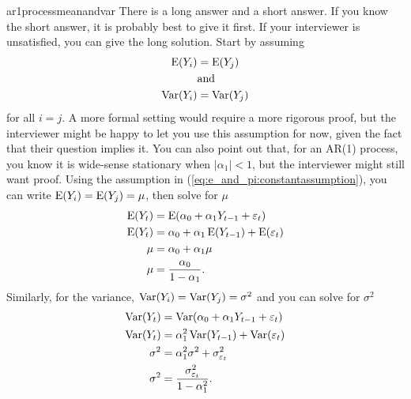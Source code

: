 \begin{answer}{ar1processmeanandvar}
There is a long answer and a short answer.
If you know the short answer, it is probably best to give it first.
If your interviewer is unsatisfied, you can give the long solution.
Start by assuming
\begin{equation}
\label{eq:e_and_pi:constantassumption}
\begin{aligned}
\operatorname{\mathrm{E}}(Y_i) &= \operatorname{\mathrm{E}}(Y_j) \\
    &\text{and}    \\
\operatorname{\mathrm{Var}}(Y_i) &= \operatorname{\mathrm{Var}}(Y_j)
\end{aligned}
\end{equation}
for all $i = j$.
A more formal setting would require a more rigorous proof, but the interviewer might be happy to let you use this assumption for now, given the fact that their question implies it.
You can also point out that, for an AR(1) process, you know it is wide-sense stationary when
$|\alpha_1| < 1$,
but the interviewer might still want proof.
Using the assumption in (\ref{eq:e_and_pi:constantassumption}), you can write
$\operatorname{\mathrm{E}}(Y_i) = \operatorname{\mathrm{E}}(Y_j) = \mu$, then solve for $\mu$
\begin{align*}
  \operatorname{\mathrm{E}}(Y_t) &= \operatorname{\mathrm{E}}(\alpha_0 + \alpha_1 Y_{t-1} + \varepsilon_{t}) \\
  \operatorname{\mathrm{E}}(Y_t) &= \alpha_0 + \alpha_1 \operatorname{\mathrm{E}}(Y_{t-1}) + \operatorname{\mathrm{E}}(\varepsilon_{t}) \\
   \mu    &= \alpha_0 + \alpha_1   \mu \\
   \mu    &= \frac{ \alpha_0}{1-\alpha_1}
   \text{.}
\end{align*}
Similarly, for the variance,
$\operatorname{\mathrm{Var}}(Y_i) = \operatorname{\mathrm{Var}}(Y_j) = \sigma^2$ and you can solve for $\sigma^2$
\begin{align*}
  \operatorname{\mathrm{Var}}(Y_t) &= \operatorname{\mathrm{Var}}(\alpha_0 + \alpha_1 Y_{t-1} + \varepsilon_{t}) \\
  \operatorname{\mathrm{Var}}(Y_t) &=  \alpha_1^2 \operatorname{\mathrm{Var}}(Y_{t-1}) + \operatorname{\mathrm{Var}}(\varepsilon_{t}) \\
  \sigma^2  &=  \alpha_1^2 \sigma^2 + \sigma^2_{\varepsilon_{t}} \\
  \sigma^2  &=  \frac{ \sigma^2_{\varepsilon_{t}}}{1- \alpha_1^2}
  \text{.}
\end{align*}


\end{answer}
